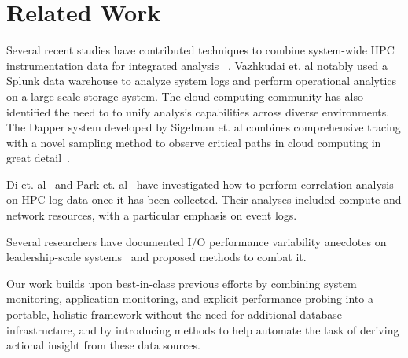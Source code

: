 \section{Related Work}

Several recent studies have contributed techniques to combine
system-wide HPC instrumentation data for integrated
analysis~\cite{Lockwood2017,Vazhkudai2017guide,Agelastos2014ldms,Kunkel2014siox}
. Vazhkudai et. al notably used a Splunk data warehouse to analyze system
logs and perform operational analytics on a large-scale storage system.
The cloud computing community has also identified the need to to unify
analysis capabilities across diverse environments. The Dapper system
developed by Sigelman et. al combines comprehensive tracing with a novel
sampling method to observe critical paths in cloud computing in great
detail~\cite{Sigelman2010dapper}.

Di et. al~\cite{7973730} and Park et. al~\cite{Park2017BigDM} have
investigated how to perform correlation analysis on HPC log data once it has been
collected.  Their analyses included compute and network resources, with a
particular emphasis on event logs.

Several researchers have documented 
I/O performance variability anecdotes on leadership-scale
systems~\cite{Lofstead2010,Yildiz2016,carns2011understanding} and proposed
methods to combat it.  

Our work builds upon best-in-class previous efforts by combining system
monitoring, application monitoring, and explicit performance probing
into a portable, holistic framework without the need for additional database
infrastructure, and by introducing methods to help automate the task
of deriving actional insight from these data sources.
